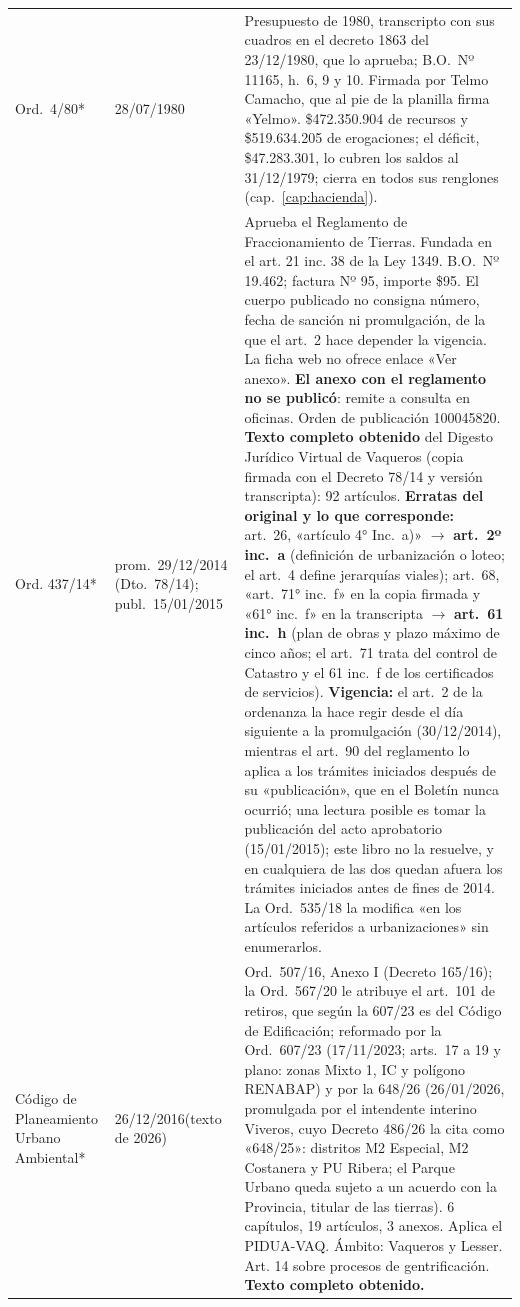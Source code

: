 \begin{longtable}{@{}p{3.2cm}p{1.9cm}p{7.9cm}@{}}
Ord.\ 4/80* & 28/07/1980 & Presupuesto de 1980, transcripto con sus cuadros en el decreto 1863 del 23/12/1980, que lo aprueba; B.O.\ Nº 11165, h.\ 6, 9 y 10. Firmada por Telmo Camacho, que al pie de la planilla firma «Yelmo». \$472.350.904 de recursos y \$519.634.205 de erogaciones; el déficit, \$47.283.301, lo cubren los saldos al 31/12/1979; cierra en todos sus renglones (cap.\ \ref{cap:hacienda}). \\
Ord. 437/14* & prom.\ 29/12/2014 (Dto.\ 78/14); publ.\ 15/01/2015 & Aprueba el Reglamento de Fraccionamiento de Tierras. Fundada en el art. 21 inc. 38 de la Ley 1349. B.O.\ Nº 19.462; factura Nº 95, importe \$95. El cuerpo publicado no consigna número, fecha de sanción ni promulgación, de la que el art.\ 2 hace depender la vigencia. La ficha web no ofrece enlace «Ver anexo». \textbf{El anexo con el reglamento no se publicó}: remite a consulta en oficinas. Orden de publicación 100045820. \textbf{Texto completo obtenido} del Digesto Jurídico Virtual de Vaqueros (copia firmada con el Decreto 78/14 y versión transcripta): 92 artículos. \textbf{Erratas del original y lo que corresponde:} art.\ 26, «artículo 4° Inc.\ a)» $\rightarrow$ \textbf{art.\ 2º inc.\ a} (definición de urbanización o loteo; el art.\ 4 define jerarquías viales); art.\ 68, «art.\ 71° inc.\ f» en la copia firmada y «61° inc.\ f» en la transcripta $\rightarrow$ \textbf{art.\ 61 inc.\ h} (plan de obras y plazo máximo de cinco años; el art.\ 71 trata del control de Catastro y el 61 inc.\ f de los certificados de servicios). \textbf{Vigencia:} el art.\ 2 de la ordenanza la hace regir desde el día siguiente a la promulgación (30/12/2014), mientras el art.\ 90 del reglamento lo aplica a los trámites iniciados después de su «publicación», que en el Boletín nunca ocurrió; una lectura posible es tomar la publicación del acto aprobatorio (15/01/2015); este libro no la resuelve, y en cualquiera de las dos quedan afuera los trámites iniciados antes de fines de 2014. La Ord.\ 535/18 la modifica «en los artículos referidos a urbanizaciones» sin enumerarlos. \\
Código de Planeamiento Urbano Ambiental* & 26/12/2016\newline (texto de 2026) & Ord.\ 507/16, Anexo I (Decreto 165/16); la Ord.\ 567/20 le atribuye el art.\ 101 de retiros, que según la 607/23 es del Código de Edificación; reformado por la Ord.\ 607/23 (17/11/2023; arts.\ 17 a 19 y plano: zonas Mixto 1, IC y polígono RENABAP) y por la 648/26 (26/01/2026, promulgada por el intendente interino Viveros, cuyo Decreto 486/26 la cita como «648/25»: distritos M2 Especial, M2 Costanera y PU Ribera; el Parque Urbano queda sujeto a un acuerdo con la Provincia, titular de las tierras). 6 capítulos, 19 artículos, 3 anexos. Aplica el PIDUA-VAQ. Ámbito: Vaqueros y Lesser. Art. 14 sobre procesos de gentrificación. \textbf{Texto completo obtenido.} \\

\end{longtable}
